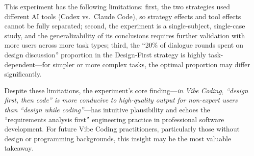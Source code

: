 This experiment has the following limitations: first, the two strategies used different AI tools (Codex vs.\ Claude Code), so strategy effects and tool effects cannot be fully separated; second, the experiment is a single-subject, single-case study, and the generalizability of its conclusions requires further validation with more users across more task types; third, the ``20\% of dialogue rounds spent on design discussion'' proportion in the Design-First strategy is highly task-dependent---for simpler or more complex tasks, the optimal proportion may differ significantly.

Despite these limitations, the experiment's core finding---\textit{in Vibe Coding, ``design first, then code'' is more conducive to high-quality output for non-expert users than ``design while coding''}---has intuitive plausibility and echoes the ``requirements analysis first'' engineering practice in professional software development. For future Vibe Coding practitioners, particularly those without design or programming backgrounds, this insight may be the most valuable takeaway.
